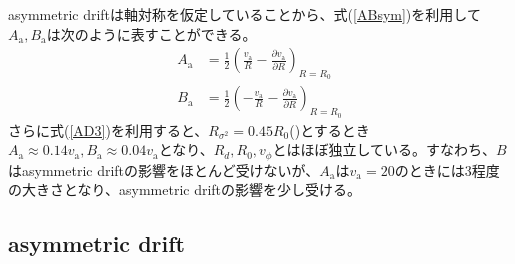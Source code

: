 asymmetric driftは軸対称を仮定していることから、式(\ref{ABsym})を利用して$A_{\mathrm{a}},B_{\mathrm{a}}$は次のように表すことができる。
\begin{subequations}
\begin{align}
	A_{\mathrm{a}} &=\frac{1}{2}\left( \frac{v_{\mathrm{a}}}{R} - \frac{\partial v_{\mathrm{a}}}{\partial R} \right)_{R=R_0} \\
	B_{\mathrm{a}} &=\frac{1}{2}\left( -\frac{v_{\mathrm{a}}}{R} - \frac{\partial v_{\mathrm{a}}}{\partial R} \right)_{R=R_0}
\end{align} \label{ABaxisym}
\end{subequations}
さらに式(\ref{AD3})を利用すると、$R_{\sigma^2}=0.45R_0$(\cite{LF1989})とするとき$A_{\mathrm{a}}\approx0.14v_{\mathrm{a}}, B_{\mathrm{a}}\approx0.04v_{\mathrm{a}}$となり、$R_d,R_0,v_{\phi}$とはほぼ独立している。すなわち、$B$はasymmetric driftの影響をほとんど受けないが、$A_{\mathrm{a}}$は$v_{\mathrm{a}}=20$のときには3程度の大きさとなり、asymmetric driftの影響を少し受ける。



\subsection{asymmetric drift} %
